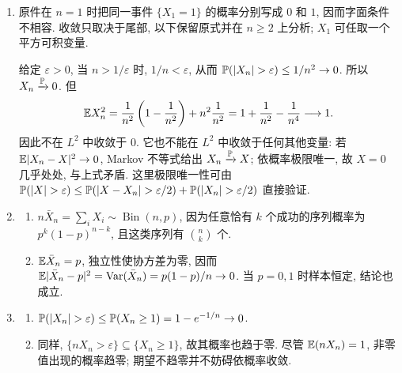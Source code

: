 \begin{solution}
\begin{enumerate}[label=\arabic*.]
\item 原件在 $n=1$ 时把同一事件 $\{X_1=1\}$ 的概率分别写成 $0$ 和 $1$, 因而字面条件不相容. 收敛只取决于尾部, 以下保留原式并在 $n\ge2$ 上分析; $X_1$ 可任取一个平方可积变量.

给定 $\varepsilon>0$, 当 $n>1/\varepsilon$ 时, $1/n<\varepsilon$, 从而 $\PP(|X_n|>\varepsilon)\le1/n^2\to0$. 所以 $X_n\xrightarrow{\mathbb P}0$. 但
\[
\mathbb E X_n^2=\frac1{n^2}\left(1-\frac1{n^2}\right)+n^2\frac1{n^2}
=1+\frac1{n^2}-\frac1{n^4}\longrightarrow1.
\]
因此不在 $L^2$ 中收敛于 $0$. 它也不能在 $L^2$ 中收敛于任何其他变量: 若 $\mathbb E|X_n-X|^2\to0$, Markov 不等式给出 $X_n\xrightarrow{\mathbb P} X$; 依概率极限唯一, 故 $X=0$ 几乎处处, 与上式矛盾. 这里极限唯一性可由 $\PP(|X|>\varepsilon)\le\PP(|X-X_n|>\varepsilon/2)+\PP(|X_n|>\varepsilon/2)$ 直接验证.
\item \begin{enumerate}[label=(\alph*)]
\item $n\bar X_n=\sum_iX_i\sim\operatorname{Bin}(n,p)$, 因为任意恰有 $k$ 个成功的序列概率为 $p^k(1-p)^{n-k}$, 且这类序列有 $\binom nk$ 个.
\item $\mathbb E\bar X_n=p$, 独立性使协方差为零, 因而
$\mathbb E|\bar X_n-p|^2=\operatorname{Var}(\bar X_n)=p(1-p)/n\to0$. 当 $p=0,1$ 时样本恒定, 结论也成立.
\end{enumerate}
\item \begin{enumerate}[label=(\alph*)]
\item $\PP(|X_n|>\varepsilon)\le\PP(X_n\ge1)=1-e^{-1/n}\to0$.
\item 同样, $\{nX_n>\varepsilon\}\subseteq\{X_n\ge1\}$, 故其概率也趋于零. 尽管 $\mathbb E(nX_n)=1$, 非零值出现的概率趋零; 期望不趋零并不妨碍依概率收敛.
\end{enumerate}
\end{enumerate}
\end{solution}

